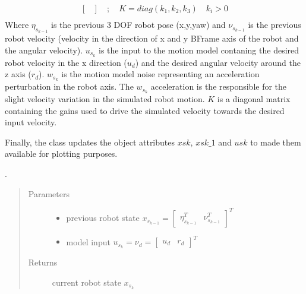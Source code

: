 \documentclass[letterpaper,10pt,english]{sphinxmanual}
\begin{document}
\begin{fulllineitems}
\begin{fulllineitems}
\begin{equation}
\begin{split}
\begin{bmatrix}
\end{bmatrix} \quad;\quad K=diag(k_1,k_2,k_3) \quad k_i>0\\\end{split}
\end{equation}
\sphinxAtStartPar
Where \(\eta_{s_{k-1}}\) is the previous 3 DOF robot pose (x,y,yaw) and \(\nu_{s_{k-1}}\) is the previous robot velocity (velocity in the direction of x and y B\sphinxhyphen{}Frame axis of the robot and the angular velocity).
\(u_{s_k}\) is the input to the motion model contaning the desired robot velocity in the x direction (\(u_d\)) and the desired angular velocity around the z axis (\(r_d\)).
\(w_{s_k}\) is the motion model noise representing an acceleration perturbation in the robot axis. The \(w_{s_k}\) acceleration is the responsible for the slight velocity variation in the simulated robot motion.
\(K\) is a diagonal matrix containing the gains used to drive the simulated velocity towards the desired input velocity.

\sphinxAtStartPar
Finally, the class updates the object attributes \(xsk\), \(xsk\_1\) and  \(usk\) to made them available for plotting purposes.

\sphinxAtStartPar
{}.
\begin{quote}\begin{description}
\item[{Parameters}] \leavevmode\begin{itemize}
\item {} 
\sphinxAtStartPar
{} \textendash{} previous robot state \(x_{s_{k-1}}=\begin{bmatrix}\eta_{s_{k-1}}^T & \nu_{s_{k-1}}^T\end{bmatrix}^T\)

\item {} 
\sphinxAtStartPar
{} \textendash{} model input \(u_{s_k}=\nu_{d}=\begin{bmatrix} u_d& r_d\end{bmatrix}^T\)

\end{itemize}

\item[{Returns}] \leavevmode
\sphinxAtStartPar
current robot state \(x_{s_k}\)

\end{description}\end{quote}


\end{fulllineitems}
\end{fulllineitems}
\end{document}
